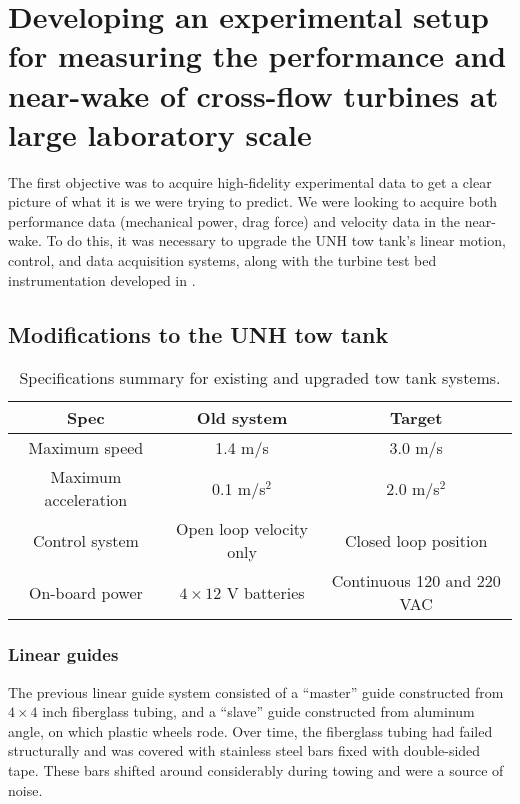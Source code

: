 \chapter{Developing an experimental setup for measuring the performance and
near-wake of cross-flow turbines at large laboratory scale}

The first objective was to acquire high-fidelity experimental data to get a
clear picture of what it is we were trying to predict. We were looking to
acquire both performance data (mechanical power, drag force) and velocity data
in the near-wake. To do this, it was necessary to upgrade the UNH tow tank's
linear motion, control, and data acquisition systems, along with the turbine
test bed instrumentation developed in \cite{Bachant2011MS}.

\section{Modifications to the UNH tow tank}

\begin{table}
\centering
\begin{tabular}{c|c|c}
Spec & Old system & Target \\ 
\hline
Maximum speed & 1.4 m/s  & 3.0 m/s \\ 
Maximum acceleration & 0.1 m/s$^2$ & 2.0 m/s$^2$ \\ 
Control system & Open loop velocity only & Closed loop position \\ 
On-board power & $4\times12$ V batteries & Continuous 120 and 220 VAC \\ 
\end{tabular}
\caption{Specifications summary for existing and upgraded tow tank systems.} 
\label{tab:tow-tank-specs}
\end{table}

\subsection{Linear guides}

The previous linear guide system consisted of a ``master'' guide constructed from
$4 \times 4$ inch fiberglass tubing, and a ``slave'' guide constructed from aluminum angle, on which plastic wheels rode. Over time, the fiberglass tubing had failed structurally and was covered with stainless steel bars fixed with double-sided tape. These bars shifted around considerably during towing and were a source of noise.

